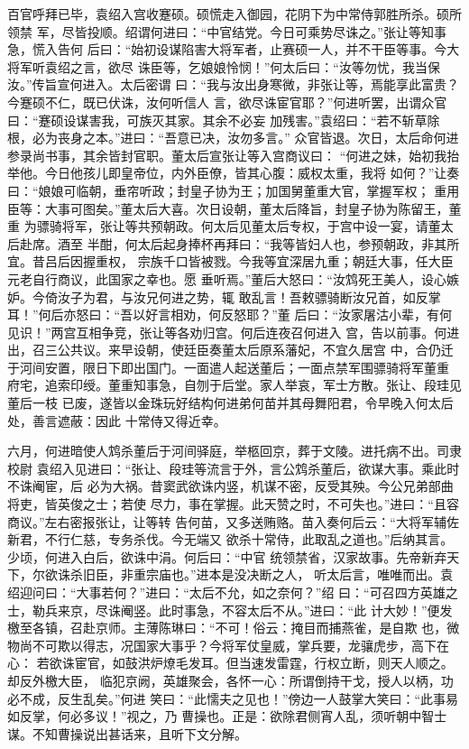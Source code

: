 百官呼拜已毕，袁绍入宫收蹇硕。硕慌走入御园，花阴下为中常侍郭胜所杀。硕所领禁
军，尽皆投顺。绍谓何进曰：“中官结党。今日可乘势尽诛之。”张让等知事急，慌入告何
后曰：“始初设谋陷害大将军者，止赛硕一人，并不干臣等事。今大将军听袁绍之言，欲尽
诛臣等，乞娘娘怜悯！”何太后曰：“汝等勿忧，我当保汝。”传旨宣何进入。太后密谓
曰：“我与汝出身寒微，非张让等，焉能享此富贵？今蹇硕不仁，既已伏诛，汝何听信人
言，欲尽诛宦官耶？”何进听罢，出谓众官曰：“蹇硕设谋害我，可族灭其家。其余不必妄
加残害。”袁绍曰：“若不斩草除根，必为丧身之本。”进曰：“吾意已决，汝勿多言。”
众官皆退。次日，太后命何进参录尚书事，其余皆封官职。董太后宣张让等入宫商议曰：
“何进之妹，始初我抬举他。今日他孩儿即皇帝位，内外臣僚，皆其心腹：威权太重，我将
如何？”让奏曰：“娘娘可临朝，垂帘听政；封皇子协为王；加国舅董重大官，掌握军权；
重用臣等：大事可图矣。”董太后大喜。次日设朝，董太后降旨，封皇子协为陈留王，董重
为骠骑将军，张让等共预朝政。何太后见董太后专权，于宫中设一宴，请董太后赴席。酒至
半酣，何太后起身捧杯再拜曰：“我等皆妇人也，参预朝政，非其所宜。昔吕后因握重权，
宗族千口皆被戮。今我等宜深居九重；朝廷大事，任大臣元老自行商议，此国家之幸也。愿
垂听焉。”董后大怒曰：“汝鸩死王美人，设心嫉妒。今倚汝子为君，与汝兄何进之势，辄
敢乱言！吾敕骠骑断汝兄首，如反掌耳！”何后亦怒曰：“吾以好言相劝，何反怒耶？”董
后曰：“汝家屠沽小辈，有何见识！”两宫互相争竞，张让等各劝归宫。何后连夜召何进入
宫，告以前事。何进出，召三公共议。来早设朝，使廷臣奏董太后原系藩妃，不宜久居宫
中，合仍迁于河间安置，限日下即出国门。一面遣人起送董后；一面点禁军围骠骑将军董重
府宅，追索印绶。董重知事急，自刎于后堂。家人举哀，军士方散。张让、段珪见董后一枝
已废，遂皆以金珠玩好结构何进弟何苗并其母舞阳君，令早晚入何太后处，善言遮蔽：因此
十常侍又得近幸。

六月，何进暗使人鸩杀董后于河间驿庭，举柩回京，葬于文陵。进托病不出。司隶校尉
袁绍入见进曰：“张让、段珪等流言于外，言公鸩杀董后，欲谋大事。乘此时不诛阉宦，后
必为大祸。昔窦武欲诛内竖，机谋不密，反受其殃。今公兄弟部曲将吏，皆英俊之士；若使
尽力，事在掌握。此天赞之时，不可失也。”进曰：“且容商议。”左右密报张让，让等转
告何苗，又多送贿赂。苗入奏何后云：“大将军辅佐新君，不行仁慈，专务杀伐。今无端又
欲杀十常侍，此取乱之道也。”后纳其言。少顷，何进入白后，欲诛中涓。何后曰：“中官
统领禁省，汉家故事。先帝新弃天下，尔欲诛杀旧臣，非重宗庙也。”进本是没决断之人，
听太后言，唯唯而出。袁绍迎问曰：“大事若何？”进曰：“太后不允，如之奈何？”绍
曰：“可召四方英雄之士，勒兵来京，尽诛阉竖。此时事急，不容太后不从。”进曰：“此
计大妙！”便发檄至各镇，召赴京师。主薄陈琳曰：“不可！俗云：掩目而捕燕雀，是自欺
也，微物尚不可欺以得志，况国家大事乎？今将军仗皇威，掌兵要，龙骧虎步，高下在心：
若欲诛宦官，如鼓洪炉燎毛发耳。但当速发雷霆，行权立断，则天人顺之。却反外檄大臣，
临犯京阙，英雄聚会，各怀一心：所谓倒持干戈，授人以柄，功必不成，反生乱矣。”何进
笑曰：“此懦夫之见也！”傍边一人鼓掌大笑曰：“此事易如反掌，何必多议！”视之，乃
曹操也。正是：欲除君侧宵人乱，须听朝中智士谋。不知曹操说出甚话来，且听下文分解。